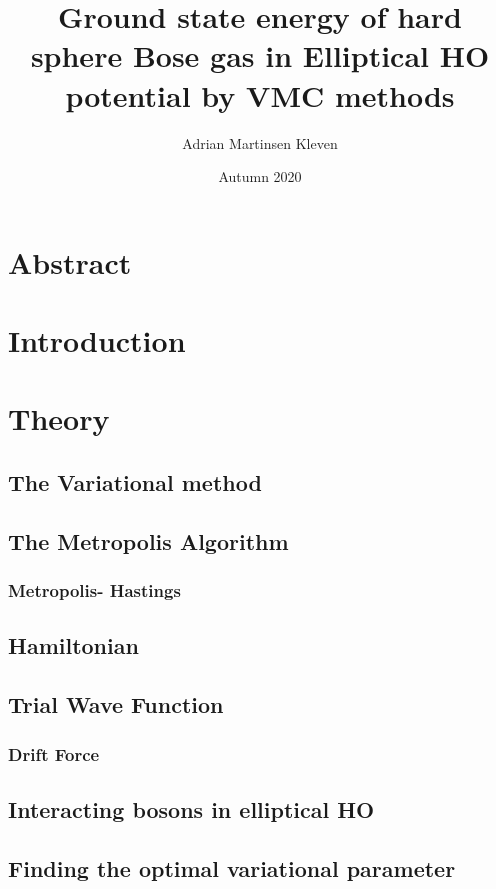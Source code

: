 \documentclass[11pt,a4paper,titlepage]{article}
\title{Ground state energy of hard sphere Bose gas in Elliptical HO potential by VMC methods}
\author{Adrian Martinsen Kleven}
\date{Autumn 2020}
\begin{document}
\maketitle
\tableofcontents
\listoffigures
\listoftables
\clearpage
\section{Abstract}


\section{Introduction}


\section{Theory}
\subsection{The Variational method}

\subsection{The Metropolis Algorithm}

\subsubsection{Metropolis- Hastings}

\subsection{Hamiltonian}

\subsection{Trial Wave Function}

 
\subsubsection{Drift Force}

\subsection{Interacting bosons in elliptical HO}


\subsection{Finding the optimal variational parameter}
\end{document}
